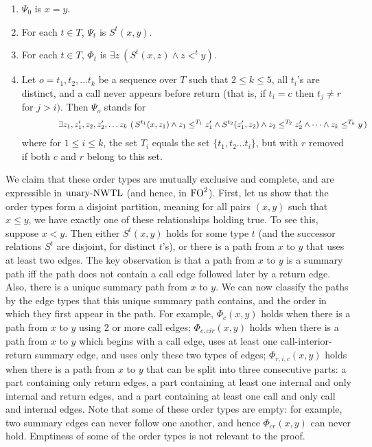 \documentclass{LMCS}
\newcommand{\FO}{{\rm FO}}
\theoremstyle{plain}
\theoremstyle{definition}
\newcommand{\ucaret}{\text{unary-}\caret}
\renewcommand{\ucaret}{\text{unary-}\nwtl}
\newcommand{\caret}{\text{CaRet}}
\newcounter{example}
\begin{document}
\begin{enumerate}[$\bullet$]
\item $\Psi_0$ is $x=y$.
\item For each $t\in T$,  $\Psi_t$ is  $S^{t}(x,y)$.
\item For each $t\in T$,  $\Phi_t$ is
$\exists z\ (S^{t}(x,z)\wedge z <^t y)$.
\item Let $o=t_1,t_2,\ldots t_k$  be a sequence over $T$ such that
$2\le k\le 5$, all $t_i$'s are distinct, and a call never appears before return
(that is, if $t_i=c$ then $t_j\not=r$ for $j>i)$.
Then $\Psi_o$ stands for
{\small
\begin{eqnarray*}
\hspace{15mm}\exists z_1,z'_1,z_2,z'_2,\ldots z_k\
(\,S^{t_1}(x,z_1) \wedge z_1\le^{T_1} z'_1 \wedge S^{t_2}(z'_1,z_2) \wedge
z_2\le^{T_2}z'_2\wedge \cdots \wedge z_k\le^{T_k} y\,)
\end{eqnarray*}}\noindent
where for $1\le i\le k$, the set $T_i$ equals the set $\{t_1,t_2\ldots t_i\}$,
but with $r$ removed if both $c$ and $r$ belong to this set.
\end{enumerate}

\noindent We claim  that these order types are
mutually exclusive and complete, and are expressible in $\ucaret$ (and hence, in 
$\FO^2$). First, let us show that the order types form a disjoint partition, 
meaning for all pairs $(x,y)$
such that $x \leq y$,  we
have exactly one of these relationships holding true. 
To see this, suppose $x < y$. Then either  $S^t(x,y)$ holds for some type $t$
(and the successor relations $S^t$ are disjoint, for distinct $t$'s), 
or there is a path from $x$ to $y$
that uses at least two edges. 
The key observation is that a path from $x$ to $y$ is a summary path iff
the path does not contain a call edge followed later by a return edge.
Also, there is a unique summary path from $x$ to $y$.
We can now classify the paths by the edge types that this unique summary
path contains, and the order in which they first appear in the path.
For example, $\Phi_{c}(x,y)$ holds when there is a path from $x$ to $y$ using 2 or more
call edges; $\Phi_{c,cir}(x,y)$ holds when there is a path from $x$ to $y$
which begins with a call edge, uses at least one call-interior-return summary edge, 
and uses only these two types of edges; 
$\Phi_{r,i,c}(x,y)$ holds when there is a path from $x$ to $y$ that can be split into
three consecutive parts:
a part containing only return edges, a part containing at least one internal 
and only internal and return edges, 
and a part containing at least one call and only call and internal edges.
Note that some of these order types are empty: for example, two summary edges can never
follow one another, and hence $\Phi_{cr}(x,y)$ can never hold. 
Emptiness of some of the order types is not relevant to the proof.
\end{document}
